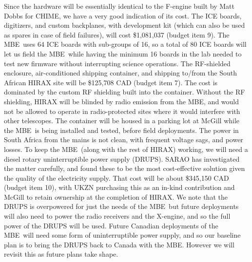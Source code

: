 \documentclass[11pt]{article}
\newcommand{\mbe}{{\rm MBE}}
\begin{document}
Since the hardware will be essentially identical to the F-engine built
by Matt Dobbs for CHIME, we have a very good indication of its cost.
The ICE boards, digitizers, and custom backplanes, with development
kit (which can also be used as spares in case of field failures), will
cost \$1,081,037 (budget item 9).  The \mbe\ uses 64 ICE boards with
sub-groups of 16, so a total of 80 ICE boards will let us field the
\mbe\ while having the minimum 16 boards in the lab needed to
test new firmware without interrupting science operations.
The RF-shielded enclosure, air-conditioned shipping container, and
shipping to/from the South African HIRAX site will be \$125,708 CAD
(budget item 7).  The cost is dominated by the custom RF shielding
built into the container.  Without the RF shielding, HIRAX will be
blinded by radio emission from the \mbe, and would not be allowed to
operate in radio-protected sites where it would interfere with other
telescopes.  The container will be housed in a parking lot at McGill
while the \mbe\ is being installed and tested, before field
deployments.
The power in South Africa from the mains is not
clean, with frequent voltage sags, and power losses.  To keep the \mbe\
(along with the rest of HIRAX) working, we will need a diesel rotary
uninterruptible power supply (DRUPS).  SARAO has investigated the
matter carefully, and found these to be the most cost-effective
solution given the quality of the electricity supply.  That cost
will be about \$345,150 CAD (budget item 10), with UKZN purchasing this as an in-kind
contribution and McGill to retain ownership at the completion of
HIRAX.  We note that the DRUPS is overpowered for just the needs of the
\mbe\, but future deployments will also need to power the radio
receivers and the X-engine, and so the full power of the DRUPS will be
used.  Future Canadian deployments of the \mbe\ will need some form of
uninterruptible power supply, and so our baseline plan is to bring the
DRUPS back to Canada with the \mbe.  However we will revisit this as
future plans take shape.
\end{document}
